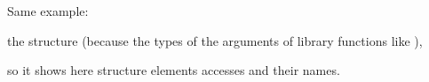 ﻿

\subsubsectionold{\OptimizingKeilVI (\ThumbMode)}

Same example:



\subsubsectionold{\OptimizingXcodeIV (\ThumbTwoMode)}

\IDA {} the  structure 
(because \IDA {} the types of the arguments of library functions like ), 

so it shows here structure elements accesses and their names.


